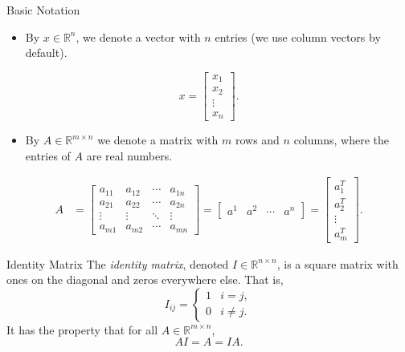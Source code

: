 \documentclass[aspectratio=169,12pt]{beamer}
\newcommand{\tightitems}{%
  \setlength{\itemsep}{0.14cm}%
  \setlength{\topsep}{0.08cm}%
  \setlength{\parsep}{0pt}%
}
\begin{document}
\begin{frame}[t]{Basic Notation}
  \vspace{-0.10cm}
  {\small
  \begin{itemize}
    \tightitems
    \item By $x\in\mathbb{R}^{n}$, we denote a vector with $n$ entries (we use column vectors by default).
  \end{itemize}
  \[
    x=\begin{bmatrix}x_1\\x_2\\\vdots\\x_n\end{bmatrix}.
  \]
  \begin{itemize}
    \tightitems
    \item By $A\in\mathbb{R}^{m\times n}$ we denote a matrix with $m$ rows and $n$ columns,
          where the entries of $A$ are real numbers.
  \end{itemize}
  \vspace{-0.12cm}
  \[
  \begin{aligned}
  A
  &=\begin{bmatrix}
      a_{11}&a_{12}&\cdots&a_{1n}\\
      a_{21}&a_{22}&\cdots&a_{2n}\\
      \vdots&\vdots&\ddots&\vdots\\
      a_{m1}&a_{m2}&\cdots&a_{mn}
    \end{bmatrix}
   =\begin{bmatrix}a^1&a^2&\cdots&a^n\end{bmatrix}
   =\begin{bmatrix}a_1^T\\a_2^T\\\vdots\\a_m^T\end{bmatrix}.
  \end{aligned}
  \]
  }
\end{frame}

\begin{frame}[t]{Identity Matrix}
  \vspace{0.42cm}
  {\large
  The \emph{identity matrix}, denoted $I\in\mathbb{R}^{n\times n}$, is a square matrix
  with ones on the diagonal and zeros everywhere else. That is,
  \[
    I_{ij}=\begin{cases}
      1 & i=j,\\
      0 & i\ne j.
    \end{cases}
  \]
  It has the property that for all $A\in\mathbb{R}^{m\times n}$,
  \[
    AI=A=IA.
  \]
  }
\end{frame}
\end{document}
